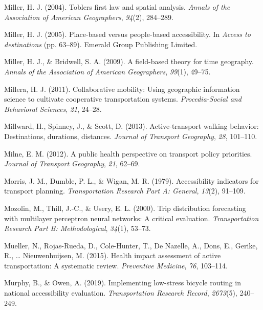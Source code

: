 \documentclass[
11pt, %
oneside, %
english, %
singlespacing, %
]{macthesis} %
\newlength{\cslhangindent}
\newenvironment{CSLReferences}[2] %
 {%
  \setlength{\parindent}{0pt}
  \ifodd #1 \everypar{\setlength{\hangindent}{\cslhangindent}}\ignorespaces\fi
  \ifnum #2 > 0
  \setlength{\parskip}{#2\baselineskip}
  \fi
 }%
 {}
\begin{document}
\begin{CSLReferences}{1}{0}
\leavevmode{}%
Miller, H. J. (2004). Toblers first law and spatial analysis. \emph{Annals of the Association of American Geographers}, \emph{94}(2), 284--289.

\leavevmode{}%
Miller, H. J. (2005). Place-based versus people-based accessibility. In \emph{Access to destinations} (pp. 63--89). Emerald Group Publishing Limited.

\leavevmode{}%
Miller, H. J., \& Bridwell, S. A. (2009). A field-based theory for time geography. \emph{Annals of the Association of American Geographers}, \emph{99}(1), 49--75.

\leavevmode{}%
Millera, H. J. (2011). Collaborative mobility: Using geographic information science to cultivate cooperative transportation systems. \emph{Procedia-Social and Behavioral Sciences}, \emph{21}, 24--28.

\leavevmode{}%
Millward, H., Spinney, J., \& Scott, D. (2013). Active-transport walking behavior: Destinations, durations, distances. \emph{Journal of Transport Geography}, \emph{28}, 101--110.

\leavevmode{}%
Milne, E. M. (2012). A public health perspective on transport policy priorities. \emph{Journal of Transport Geography}, \emph{21}, 62--69.

\leavevmode{}%
Morris, J. M., Dumble, P. L., \& Wigan, M. R. (1979). Accessibility indicators for transport planning. \emph{Transportation Research Part A: General}, \emph{13}(2), 91--109.

\leavevmode{}%
Mozolin, M., Thill, J.-C., \& Usery, E. L. (2000). Trip distribution forecasting with multilayer perceptron neural networks: A critical evaluation. \emph{Transportation Research Part B: Methodological}, \emph{34}(1), 53--73.

\leavevmode{}%
Mueller, N., Rojas-Rueda, D., Cole-Hunter, T., De Nazelle, A., Dons, E., Gerike, R., \ldots{} Nieuwenhuijsen, M. (2015). Health impact assessment of active transportation: A systematic review. \emph{Preventive Medicine}, \emph{76}, 103--114.

\leavevmode{}%
Murphy, B., \& Owen, A. (2019). Implementing low-stress bicycle routing in national accessibility evaluation. \emph{Transportation Research Record}, \emph{2673}(5), 240--249.


\end{CSLReferences}
\end{document}

